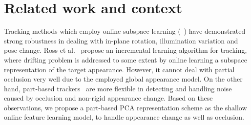 \documentclass[preprint,12pt,review]{elsarticle}
\begin{document}
\section{Related work and context}
%
Tracking methods which employ online subspace learning (~\cite{ ross2008incremental, wang2010incremental, wang2007object, hu2011incremental}) have demonstrated strong robustness in dealing with in-plane rotation, illumination variation and pose change.
%
Ross et al.~\cite{ross2008incremental} propose an incremental learning algorithm for tracking, where drifting problem is addressed to some extent by online learning a subspace representation of the target appearance.
%
%
However, it cannot deal with partial occlusion very well due to the employed global appearance model.
%
On the other hand, part-based trackers~\cite{adam2006Frag, liu2011robust} are more flexible in detecting and handling noise caused by occlusion and non-rigid appearance change.
%
Based on these observations, we propose a part-based PCA representation scheme as the shallow online feature learning model, to handle appearance change as well as occlusion.
\end{document}
